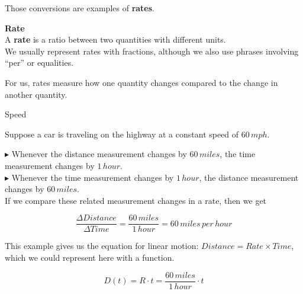 \documentclass{ximera}
\begin{document}
Those conversions are examples of \textbf{rates}. 








\begin{definition} \textbf{\textcolor{green!50!black}{Rate}} \\

A \textbf{rate} is a ratio between two quantities with different units.   \\



We usually represent rates with fractions, although we also use phrases involving ``per'' or equalities.

\end{definition}


For us, rates measure how one quantity changes compared to the change in another quantity.











\begin{example} Speed


Suppose a car is traveling on the highway at a constant speed of $60 \, mph$.


$\blacktriangleright$ Whenever the distance measurement changes by $60 \, miles$, the time measurement changes by $1 \, hour$. \\
$\blacktriangleright$ Whenever the time measurement changes by $1 \, hour$, the distance measurement changes by $60 \, miles$. \\




If we compare these related measurement changes in a rate, then we get

\[
\frac{\Delta Distance}{\Delta Time} = \frac{60 \, miles}{1 \, hour} = 60 \,miles \, per \, hour
\]


\end{example} 



This example gives us the equation for linear motion: $Distance = Rate \times Time$, which we could represent here with a function.

\[
D(t) = R \cdot t =  \frac{60 \, miles}{1 \, hour} \cdot t
\]
\end{document}
